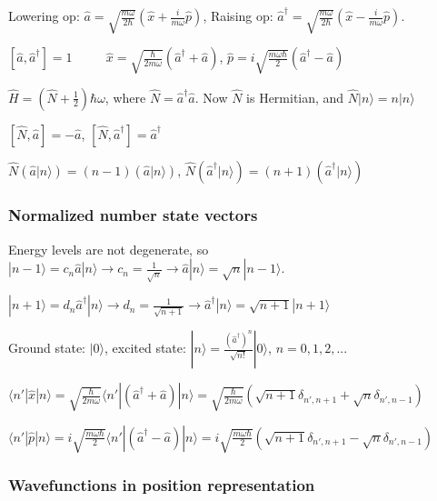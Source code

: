 Lowering op: $\widehat{a} = \sqrt{\frac{m \omega}{2 \hbar}} (\widehat{x} + \frac{i}{m \omega} \widehat{p})$, Raising op: $\widehat{a}^{\dag} = \sqrt{\frac{m \omega}{2 \hbar}} (\widehat{x} - \frac{i}{m \omega} \widehat{p})$.

$[\widehat{a}, \widehat{a}^{\dag}] = 1$ $\qquad$ $\widehat{x} = \sqrt{\frac{\hbar}{2 m \omega}} (\widehat{a}^{\dag} + \widehat{a})$, $\widehat{p} = i \sqrt{\frac{m \omega \hbar}{2}} (\widehat{a}^{\dag} - \widehat{a})$

$\widehat{H} = (\widehat{N} + \frac{1}{2}) \hbar \omega$, where $\widehat{N} = \widehat{a}^{\dag} \widehat{a}$. Now $\widehat{N}$ is Hermitian, and $\widehat{N} | n \rangle = n | n \rangle$

$[\widehat{N}, \widehat{a}] = -\widehat{a}$, $[\widehat{N}, \widehat{a}^{\dag}] = \widehat{a}^{\dag}$

$\widehat{N} (\widehat{a} | n \rangle) = (n-1)(\widehat{a} | n \rangle)$, $\widehat{N} (\widehat{a}^{\dag} | n \rangle) = (n + 1)(\widehat{a}^{\dag} | n \rangle)$ 

\subsubsection{Normalized number state vectors}
Energy levels are not degenerate, so
$|n - 1 \rangle = c_n \widehat{a} | n \rangle \rightarrow c_n = \frac{1}{\sqrt{n}} \rightarrow \widehat{a} | n \rangle = \sqrt{n} | n - 1 \rangle$.

$|n + 1 \rangle = d_n \widehat{a}^{\dag} | n \rangle \rightarrow d_n = \frac{1}{\sqrt{n+1}} \rightarrow \widehat{a}^{\dag} | n \rangle = \sqrt{n+1} | n + 1 \rangle$

Ground state: $|0 \rangle$, excited state: $|n \rangle = \frac{(\widehat{a}^{\dag})^n}{\sqrt{n!}} | 0 \rangle$, $n=0,1,2,...$

\tiny
$\langle n' | \widehat{x} | n \rangle = \sqrt{\frac{\hbar}{2m\omega}} \langle n' | (\widehat{a}^{\dag} + \widehat{a}) | n \rangle = \sqrt{\frac{\hbar}{2 m \omega}} (\sqrt{n+1} \delta_{n', n+1} + \sqrt{n} \delta_{n', n-1})$

$\langle n' | \widehat{p} | n \rangle = i \sqrt{\frac{m \omega \hbar}{2}} \langle n' | (\widehat{a}^{\dag} - \widehat{a}) | n \rangle = i \sqrt{\frac{m \omega \hbar}{2}} (\sqrt{n+1} \delta_{n', n+1} - \sqrt{n} \delta_{n', n-1})$

\scriptsize
\subsubsection{Wavefunctions in position representation}

